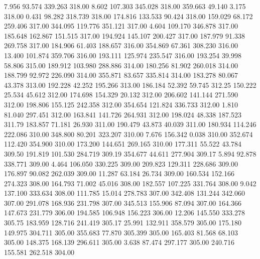    7.956   93.574  339.263       318.00
   8.602  107.303  345.028       318.00
 359.663   49.140    3.175       318.00
   0.431   98.282  318.739       318.00
 174.816  133.533   90.424       318.00
 159.029   68.172  259.406       317.00
 344.095  119.776  351.121       317.00
   4.604  109.170  346.878       317.00
 185.648  162.867  151.515       317.00
 194.924  145.107  200.427       317.00
 187.979   91.338  269.758       317.00
 184.906   61.403  188.657       316.00
 354.869   67.361  308.230       316.00
  13.400  101.874  359.706       316.00
 193.111  125.974  235.547       316.00
 193.254   39.998   58.806       315.00
 189.912  103.980  288.886       314.00
 180.256   81.902  260.018       314.00
 188.799   92.972  226.090       314.00
 355.871   83.657  335.814       314.00
 183.278   80.067   43.378       313.00
 192.228   42.252  195.266       313.00
 186.184   52.392   59.745       312.25
 150.222   25.534   45.612       312.00
 174.698  154.329   20.132       312.00
 206.602  141.144  271.590       312.00
 198.806  155.125  242.358       312.00
 354.654  121.824  336.733       312.00
   1.810   81.040  297.451       312.00
 163.841  141.726  264.931       312.00
 198.024   48.338  187.523       311.79
 183.857   71.181   26.930       311.00
 190.479   43.873   40.039       311.00
 180.934  114.246  222.086       310.00
 348.800   80.201  323.207       310.00
   7.676  156.342    0.038       310.00
 352.674  112.420  354.900       310.00
 173.200  144.651  269.165       310.00
 177.311   55.522   43.784       309.50
 191.819  101.530  284.719       309.19
 354.677   44.611  277.904       309.17
   5.894   92.878  338.771       309.00
   4.464  106.050  330.225       309.00
 209.823  129.311  228.686       309.00
 176.897   90.082  262.039       309.00
  11.287   63.184   26.734       309.00
 160.534  152.166  274.323       308.00
 164.793   71.002   45.016       308.00
 182.557  107.225  331.764       308.00
   9.042  137.100  333.634       308.00
 111.785   15.014  278.783       307.00
 342.408  131.244  342.060       307.00
 291.078  168.936  231.798       307.00
 345.513  155.906   87.094       307.00
 164.366  147.673  231.779       306.00
 194.585  106.948  156.223       306.00
  12.206  145.550  333.278       305.75
 183.959  128.716  241.419       305.17
  25.991  132.911  358.579       305.00
 175.180  149.975  304.711       305.00
 355.683   77.870  305.399       305.00
 165.403   81.568   68.103       305.00
 148.375  168.139  296.611       305.00
   3.638   87.474  297.177       305.00
 240.716  155.581  262.518       304.00
